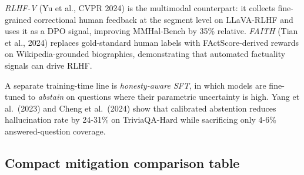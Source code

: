 \emph{RLHF-V} (Yu et al., CVPR 2024) is the multimodal counterpart: it collects fine-grained correctional human feedback at the segment level on LLaVA-RLHF and uses it as a DPO signal, improving MMHal-Bench by 35\% relative. \emph{FAITH} (Tian et al., 2024) replaces gold-standard human labels with FActScore-derived rewards on Wikipedia-grounded biographies, demonstrating that automated factuality signals can drive RLHF.

A separate training-time line is \emph{honesty-aware SFT}, in which models are fine-tuned to \emph{abstain} on questions where their parametric uncertainty is high. Yang et al.~(2023) and Cheng et al.~(2024) show that calibrated abstention reduces hallucination rate by 24-31\% on TriviaQA-Hard while sacrificing only 4-6\% answered-question coverage.

\subsection{Compact mitigation comparison table}\label{compact-mitigation-comparison-table}

